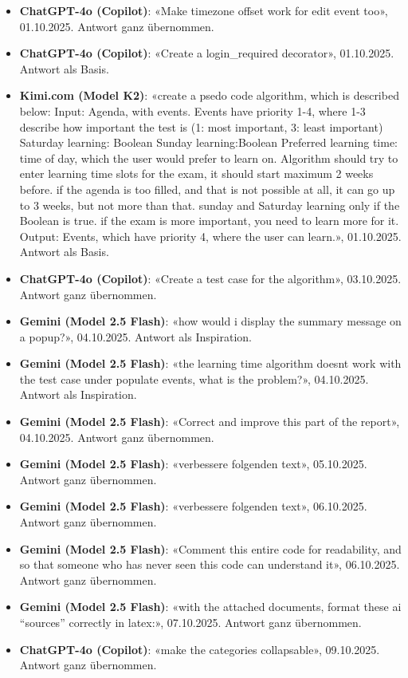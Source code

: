 \documentclass[12pt, a4paper]{article}
\begin{document}
\begin{itemize}
    \item \textbf{ChatGPT-4o (Copilot)}: «Make timezone offset work for edit event too», 01.10.2025. Antwort ganz übernommen.
    
    \item \textbf{ChatGPT-4o (Copilot)}: «Create a login\_required decorator», 01.10.2025. Antwort als Basis.
    
    \item \textbf{Kimi.com (Model K2)}: «create a psedo code algorithm, which is described below: Input: Agenda, with events. Events have priority 1-4, where 1-3 describe how important the test is (1: most important, 3: least important) Saturday learning: Boolean Sunday learning:Boolean Preferred learning time: time of day, which the user would prefer to learn on. Algorithm should try to enter learning time slots for the exam, it should start maximum 2 weeks before. if the agenda is too filled, and that is not possible at all, it can go up to 3 weeks, but not more than that. sunday and Saturday learning only if the Boolean is true. if the exam is more important, you need to learn more for it. Output: Events, which have priority 4, where the user can learn.», 01.10.2025. Antwort als Basis.
    
    \item \textbf{ChatGPT-4o (Copilot)}: «Create a test case for the algorithm», 03.10.2025. Antwort ganz übernommen.
    
    \item \textbf{Gemini (Model 2.5 Flash)}: «how would i display the summary message on a popup?», 04.10.2025. Antwort als Inspiration.
    
    \item \textbf{Gemini (Model 2.5 Flash)}: «the learning time algorithm doesnt work with the test case under populate events, what is the problem?», 04.10.2025. Antwort als Inspiration.
    
    \item \textbf{Gemini (Model 2.5 Flash)}: «Correct and improve this part of the report», 04.10.2025. Antwort ganz übernommen.
    
    \item \textbf{Gemini (Model 2.5 Flash)}: «verbessere folgenden text», 05.10.2025. Antwort ganz übernommen.
    
    \item \textbf{Gemini (Model 2.5 Flash)}: «verbessere folgenden text», 06.10.2025. Antwort ganz übernommen.
    
    \item \textbf{Gemini (Model 2.5 Flash)}: «Comment this entire code for readability, and so that someone who has never seen this code can understand it», 06.10.2025. Antwort ganz übernommen.
    
    \item \textbf{Gemini (Model 2.5 Flash)}: «with the attached documents, format these ai ``sources'' correctly in latex:», 07.10.2025. Antwort ganz übernommen.
    
    \item \textbf{ChatGPT-4o (Copilot)}: «make the categories collapsable», 09.10.2025. Antwort ganz übernommen.
    
\end{itemize}
\end{document}
